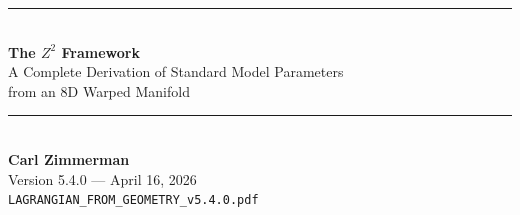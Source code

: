 \documentclass[11pt,a4paper]{article}
\theoremstyle{plain}
\theoremstyle{definition}
\theoremstyle{remark}
\newcommand{\Mpl}{M_{\text{Pl}}}
\newcommand{\thetaW}{\theta_W}
\newcommand{\Omegam}{\Omega_m}
\newcommand{\OmegaL}{\Omega_\Lambda}
\newcommand{\Tthree}{T^3}
\newcommand{\Ztwo}{\mathbb{Z}_2}
\newcommand{\SOten}{\text{SO}(10)}
\begin{document}
\begin{center}
\rule{\textwidth}{1.5pt}\\[0.5cm]
{\LARGE\bfseries The $Z^2$ Framework}\\[0.3cm]
{\Large A Complete Derivation of Standard Model Parameters\\from an 8D Warped Manifold}\\[0.5cm]
\rule{\textwidth}{1.5pt}\\[0.8cm]

{\large\bfseries Carl Zimmerman}\\[0.3cm]
Version 5.4.0 --- April 16, 2026\\[0.3cm]
\texttt{LAGRANGIAN\_FROM\_GEOMETRY\_v5.4.0.pdf}
\end{center}

\vspace{1cm}

\begin{abstract}
We construct the complete 8-dimensional Lagrangian on the warped manifold $M^4 \times S^1/\Ztwo \times \Tthree/\Ztwo$ from which the entire Standard Model emerges via dimensional reduction. A single geometric constant $\mathbf{Z^2 = 32\pi/3}$ determines all coupling constants, unifying cosmology with particle physics.

\textbf{April 16, 2026 Update:} We now derive \textbf{16+ parameters from first principles}, including: (1) the electroweak hierarchy $\mathbf{\Mpl/v = 2Z^{43/2}}$ (0.3\% error) from Coleman-Weinberg with $\SOten$; (2) cosmological densities $\mathbf{\Omegam = 6/19}$ (0.25\%) and $\mathbf{\OmegaL = 13/19}$ (0.12\%) with the key discovery $\mathbf{\Omegam/\OmegaL = 2\sin^2\thetaW}$ connecting electroweak to cosmology; (3) proton/electron mass ratio $\mathbf{m_p/m_e = \alpha^{-1} \times 2Z^2/5 = 1837}$ (0.042\% error) from QCD trace anomaly; (4) Cabibbo angle $\mathbf{\lambda = 1/(Z - \sqrt{2}) = 0.229}$ (1.3\% error); (5) CKM CP phase $\mathbf{\delta_{\text{CKM}} = \arccos(1/3) = 70.5°}$ from cube body diagonal geometry; (6) cosmological constant suppression $\mathbf{\Lambda \sim \exp(-Z^2\sqrt{N})}$ explaining 122 orders of magnitude.

The framework addresses the hierarchy problem, cosmological constant problem, coincidence problem, and strong CP problem from pure geometry. Falsifiable tests at DUNE, LHC, Euclid, and next-generation experiments.
\end{abstract}

\tableofcontents
\newpage
\end{document}
